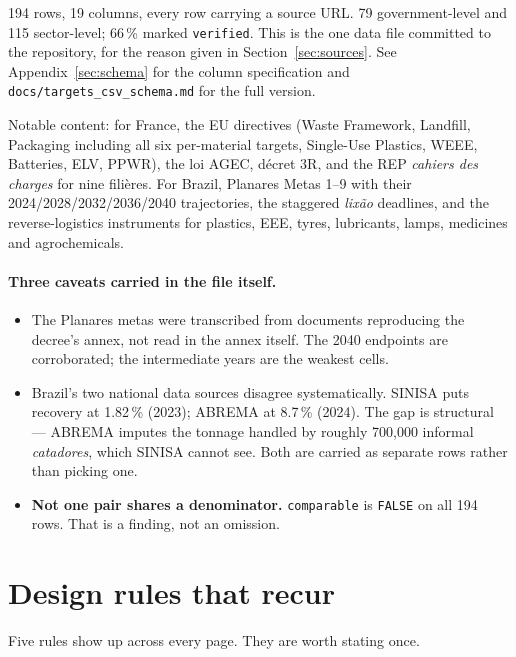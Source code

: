 \documentclass[11pt,a4paper]{article}
\newcommand{\file}[1]{\texttt{#1}}
\begin{document}
194 rows, 19 columns, every row carrying a source URL. 79 government-level and
115 sector-level; 66\,\% marked \file{verified}. This is the one data file
committed to the repository, for the reason given in Section~\ref{sec:sources}. See
Appendix~\ref{sec:schema} for the column specification and
\file{docs/targets\_csv\_schema.md} for the full version.

Notable content: for France, the EU directives (Waste Framework, Landfill,
Packaging including all six per-material targets, Single-Use Plastics, WEEE,
Batteries, ELV, PPWR), the loi AGEC, décret 3R, and the REP \emph{cahiers des
charges} for nine filières. For Brazil, Planares Metas 1--9 with their
2024/2028/2032/2036/2040 trajectories, the staggered \emph{lixão} deadlines, and
the reverse-logistics instruments for plastics, EEE, tyres, lubricants, lamps,
medicines and agrochemicals.

\paragraph{Three caveats carried in the file itself.}
\begin{itemize}
  \item The Planares metas were transcribed from documents reproducing the
        decree's annex, not read in the annex itself. The 2040 endpoints are
        corroborated; the intermediate years are the weakest cells.
  \item Brazil's two national data sources disagree systematically. SINISA puts
        recovery at 1.82\,\% (2023); ABREMA at 8.7\,\% (2024). The gap is
        structural --- ABREMA imputes the tonnage handled by roughly 700{,}000
        informal \emph{catadores}, which SINISA cannot see. Both are carried as
        separate rows rather than picking one.
  \item \textbf{Not one pair shares a denominator.} \file{comparable} is
        \file{FALSE} on all 194 rows. That is a finding, not an omission.
\end{itemize}

\section{Design rules that recur}

Five rules show up across every page. They are worth stating once.
\end{document}
